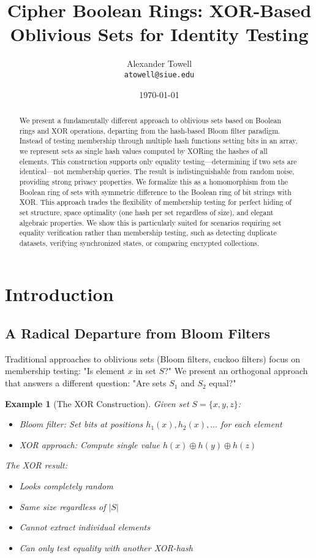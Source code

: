 \documentclass[11pt,final,hidelinks]{article}
\title{Cipher Boolean Rings: XOR-Based Oblivious Sets for Identity Testing}
\author{
    Alexander Towell\\
    \texttt{atowell@siue.edu}
}
\date{\today}
\newcommand{\XOR}{\oplus}
\newtheorem{example}[theorem]{Example}
\begin{document}
\maketitle

\begin{abstract}
We present a fundamentally different approach to oblivious sets based on Boolean rings and XOR operations, departing from the hash-based Bloom filter paradigm. Instead of testing membership through multiple hash functions setting bits in an array, we represent sets as single hash values computed by XORing the hashes of all elements. This construction supports only equality testing—determining if two sets are identical—not membership queries. The result is indistinguishable from random noise, providing strong privacy properties. We formalize this as a homomorphism from the Boolean ring of sets with symmetric difference to the Boolean ring of bit strings with XOR. This approach trades the flexibility of membership testing for perfect hiding of set structure, space optimality (one hash per set regardless of size), and elegant algebraic properties. We show this is particularly suited for scenarios requiring set equality verification rather than membership testing, such as detecting duplicate datasets, verifying synchronized states, or comparing encrypted collections.
\end{abstract}

\ObliviousNotationGuide

\section{Introduction}

\subsection{A Radical Departure from Bloom Filters}

Traditional approaches to oblivious sets (Bloom filters, cuckoo filters) focus on membership testing: "Is element $x$ in set $S$?" We present an orthogonal approach that answers a different question: "Are sets $S_1$ and $S_2$ equal?"

\begin{example}[The XOR Construction]
Given set $S = \{x, y, z\}$:
\begin{itemize}
    \item Bloom filter: Set bits at positions $h_1(x), h_2(x), \ldots$ for each element
    \item XOR approach: Compute single value $h(x) \XOR h(y) \XOR h(z)$
\end{itemize}
The XOR result:
\begin{itemize}
    \item Looks completely random
    \item Same size regardless of $|S|$
    \item Cannot extract individual elements
    \item Can only test equality with another XOR-hash
\end{itemize}
\end{example}
\end{document}
